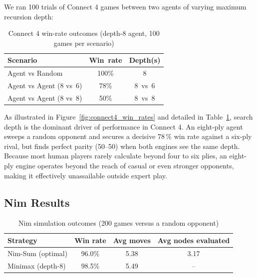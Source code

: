 \documentclass[12pt]{article}
\begin{document}
We ran 100 trials of Connect 4 games between two agents of varying maximum recursion depth:
\begin{table}[H]
    \centering
    \begin{tabular}{lcc}
        \toprule
        \textbf{Scenario} & \textbf{Win rate} & \textbf{Depth(s)} \\
        \midrule
        Agent vs Random & 100\% & 8 \\
        Agent vs Agent (8 vs 6) & 78\%  & 8 vs 6 \\
        Agent vs Agent (8 vs 8) & 50\%  & 8 vs 8 \\
        \bottomrule
    \end{tabular}
    \caption{Connect 4 win-rate outcomes (depth-8 agent, 100 games per scenario)}
    \label{tab:c4_win_rates}
\end{table}

As illustrated in Figure~\ref{fig:connect4_win_rates} and detailed in Table~\ref{tab:c4_win_rates},
search depth is the dominant driver of performance in Connect 4.
An eight-ply agent sweeps a random opponent and secures a decisive 78\,\% win rate against a six-ply rival, but finds perfect parity (50–50) when both engines see the same depth. Because most human players rarely calculate beyond four to six plies, an eight-ply engine operates beyond the reach of casual or even stronger opponents, making it effectively unassailable outside expert play.

\subsection{Nim Results}


\begin{table}[H]
    \centering
    \begin{tabular}{lccc}
        \toprule
        \textbf{Strategy} & \textbf{Win rate} & \textbf{Avg moves} & \textbf{Avg nodes evaluated} \\
        \midrule
        Nim-Sum (optimal) & 96.0\% & 5.38 & 3.17 \\
        Minimax (depth-8) & 98.5\% & 5.49 & -- \\
        \bottomrule
    \end{tabular}
    \caption{Nim simulation outcomes (200 games versus a random opponent)}
    \label{tab:nim_results}
\end{table}
\end{document}
